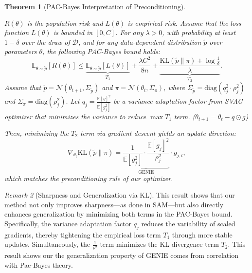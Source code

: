 \documentclass{article}
\theoremstyle{plain}
\newtheorem{theorem}{Theorem}[section]
\theoremstyle{definition}
\theoremstyle{remark}
\newtheorem{remark}[theorem]{Remark}
\begin{document}
\begin{theorem}[PAC-Bayes Interpretation of Preconditioning]
\label{thm:pac-precondition}

\(R(\theta)\) is the population risk and \(L(\theta)\) is empirical risk. Assume that the loss function \( L(\theta) \) is bounded in \([0, C]\). For any \( \lambda > 0 \), with probability at least \( 1 - \delta \) over the draw of \( \mathcal{D} \),  and for any data-dependent distribution \( \tilde{p} \) over parameters \( \theta \), the following PAC-Bayes bound holds:
\[
\mathbb{E}_{\theta \sim \tilde{p}}[R(\theta)]
\le
\underbrace{\mathbb{E}_{\theta \sim \tilde{p}}[L(\theta)]}_{T_1}
+ \frac{\lambda C^2}{8n}
+ \underbrace{\frac{\mathrm{KL}(\tilde{p} \| \pi) + \log \tfrac{1}{\delta}}{\lambda}}_{T_2}.
\]
Assume that \( \tilde{p} = \mathcal{N}(\theta_{t+1}, \Sigma_{\tilde{p}}) \) and \( \pi = \mathcal{N}(\theta_t, \Sigma_\pi) \), where \( \Sigma_{\tilde{p}} = \mathrm{diag}(q_j^2 \cdot \rho_j^2) \) and \( \Sigma_\pi = \mathrm{diag}(\rho_j^2) \). Let \( q_j = \frac{\mathbb{E}[g]^2}{\mathbb{E}[g_j^2]} \) be a variance adaptation factor from SVAG optimizer\cite{dissecting} that minimizes the variance to reduce \( \max{ T_1} \) term. ($\theta_{t+1}=\theta_t-q \odot g$)

Then, minimizing the $T_2$ term via gradient descent yields an update direction:
\[
\nabla_{\theta_t} \mathrm{KL}(\tilde{p} \| \pi) = \underbrace{ \frac{1}{\mathbb{E}[g_j^2]} \cdot \frac{\mathbb{E}[g_j]^2}{\rho_j^2} }_{\text{GENIE}} \cdot g_{j,t},
\]
which matches the preconditioning rule of our optimizer.
\end{theorem}

\begin{remark}[Sharpness and Generalization via KL]
This result shows that our method not only improves sharpness—as done in SAM—but also directly enhances generalization by minimizing both terms in the PAC-Bayes bound. Specifically, the variance adaptation factor \( q_j \) reduces the variability of scaled gradients, thereby tightening the empirical loss term \( T_1 \) through more stable updates. Simultaneously, the $\frac{1}{\rho^2}$ term  minimizes the KL divergence term \( T_2 \). This result shows our the generalization property of GENIE comes from correlation with Pac-Bayes theory.%
\end{remark}
\end{document}

